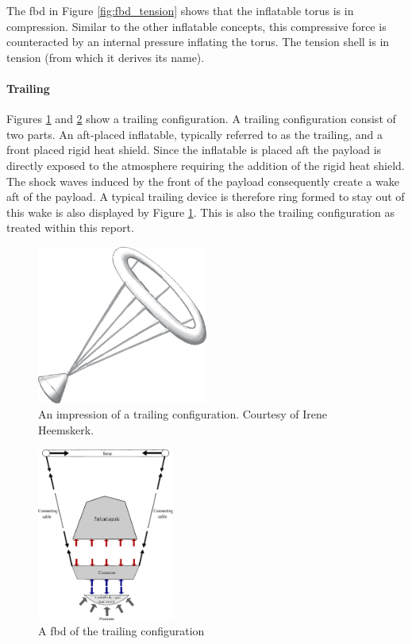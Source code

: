 The \gls{fbd} in Figure  \ref{fig:fbd_tension} shows that the inflatable torus is in compression. Similar to the other inflatable concepts, this compressive force is counteracted by an internal pressure inflating the torus. The tension shell is in tension (from which it derives its name). 

\paragraph{Trailing}

Figures \ref{fig:conc_trailing} and \ref{fig:fbd_trailing} show a trailing configuration. A trailing configuration consist of two parts. An aft-placed inflatable, typically referred to as the trailing, and a front placed rigid heat shield. Since the inflatable is placed aft the payload is directly exposed to the atmosphere requiring the addition of the rigid heat shield. The shock waves induced by the front of the payload consequently create a wake aft of the payload. A typical trailing device is therefore ring formed to stay out of this wake is also displayed by Figure  \ref{fig:conc_trailing}. This is also the trailing configuration as treated within this report.

\begin{figure}[H]
\centering
\includegraphics[width = 0.5\textwidth]{Figure/trailing_ballute.eps}

\caption{An impression of a trailing configuration. Courtesy of Irene Heemskerk.}

\label{fig:conc_trailing}
\end{figure}

\begin{figure}[H]
\centering
\includegraphics[width = 0.4\textwidth]{Figure/FBD_trailing.eps}
\caption{A \gls{fbd} of the trailing configuration}
\label{fig:fbd_trailing}
\end{figure}

